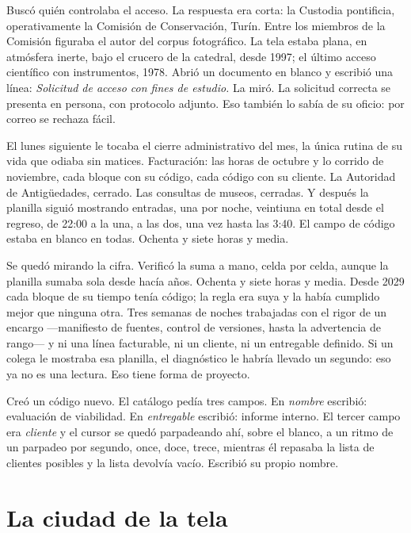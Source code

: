 Buscó quién controlaba el acceso. La respuesta era corta: la Custodia pontificia, operativamente la Comisión de Conservación, Turín. Entre los miembros de la Comisión figuraba el autor del corpus fotográfico. La tela estaba plana, en atmósfera inerte, bajo el crucero de la catedral, desde 1997; el último acceso científico con instrumentos, 1978. Abrió un documento en blanco y escribió una línea: \textit{Solicitud de acceso con fines de estudio.} La miró. La solicitud correcta se presenta en persona, con protocolo adjunto. Eso también lo sabía de su oficio: por correo se rechaza fácil.

El lunes siguiente le tocaba el cierre administrativo del mes, la única rutina de su vida que odiaba sin matices. Facturación: las horas de octubre y lo corrido de noviembre, cada bloque con su código, cada código con su cliente. La Autoridad de Antigüedades, cerrado. Las consultas de museos, cerradas. Y después la planilla siguió mostrando entradas, una por noche, veintiuna en total desde el regreso, de 22:00 a la una, a las dos, una vez hasta las 3:40. El campo de código estaba en blanco en todas. Ochenta y siete horas y media.

Se quedó mirando la cifra. Verificó la suma a mano, celda por celda, aunque la planilla sumaba sola desde hacía años. Ochenta y siete horas y media. Desde 2029 cada bloque de su tiempo tenía código; la regla era suya y la había cumplido mejor que ninguna otra. Tres semanas de noches trabajadas con el rigor de un encargo ---manifiesto de fuentes, control de versiones, hasta la advertencia de rango--- y ni una línea facturable, ni un cliente, ni un entregable definido. Si un colega le mostraba esa planilla, el diagnóstico le habría llevado un segundo: eso ya no es una lectura. Eso tiene forma de proyecto.

Creó un código nuevo. El catálogo pedía tres campos. En \textit{nombre} escribió: evaluación de viabilidad. En \textit{entregable} escribió: informe interno. El tercer campo era \textit{cliente} y el cursor se quedó parpadeando ahí, sobre el blanco, a un ritmo de un parpadeo por segundo, once, doce, trece, mientras él repasaba la lista de clientes posibles y la lista devolvía vacío. Escribió su propio nombre.

\clearpage

\chapter{La ciudad de la tela}

